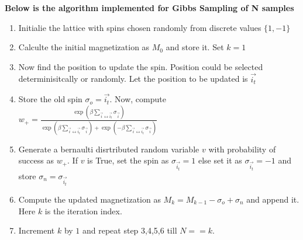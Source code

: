 \documentclass[11pt]{article}
\begin{document}
\noindent \textbf{Below is the algorithm implemented for Gibbs Sampling of N samples}
\begin{enumerate}
    \item Initialie the lattice with spins chosen randomly from discrete values $\{1, -1\}$
    \item Calculte the initial magnetization as $M_{0}$ and store it. Set $k = 1$
    \item Now find the position to update the spin. Position could be selected determinisitcally or randomly. Let the position to be updated is $\overrightarrow{i_{t}}$
    \item Store the old spin $\sigma_{o} = \overrightarrow{i_{t}}$. Now, compute $w_{+} = \frac{ \exp{\left( \beta \sum_{{\overrightarrow{i}} \leftrightarrow \overrightarrow{i_{t}}} \sigma_{\overrightarrow{i}} \right)} } { \exp{\left( \beta \sum_{{\overrightarrow{i}} \leftrightarrow \overrightarrow{i_{t}}} \sigma_{\overrightarrow{i}} \right)} +  \exp{\left( -\beta \sum_{{\overrightarrow{i}} \leftrightarrow \overrightarrow{i_{t}}} \sigma_{\overrightarrow{i}} \right)}}$
    \item Generate a bernaulti disrtributed random variable $v$ with probability of success as $w_{+}$. If $v$ is True, set the spin as $\sigma_{\overrightarrow{i_{t}}} = 1$ else set it as $\sigma_{\overrightarrow{i_{t}}} = -1$ and store $\sigma_{n} = \sigma_{\overrightarrow{i_{t}}}$
    \item Compute the updated magnetization as $M_k = M_{k - 1} - \sigma_o + \sigma_n$ and append it. Here $k$ is the iteration index.
    \item Increment $k$ by $1$ and repeat step 3,4,5,6 till $N == k$.
\end{enumerate}
\end{document}
